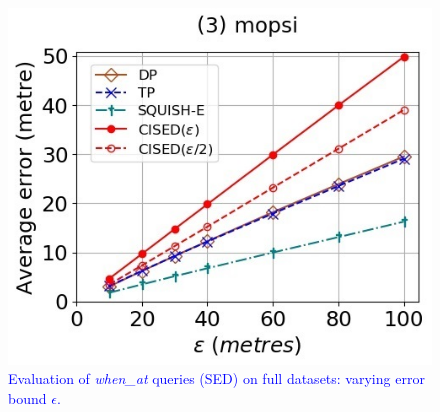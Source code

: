 \begin{figure}[tb!]
	\includegraphics[scale = 0.400]{Figures/Exp-when-SED-error-epsilon-mopsi.jpg}
	\vspace{-1ex}
	\caption{\small \textcolor{blue}{Evaluation of \emph{when\_at} queries (SED) on full datasets: varying error bound $\epsilon$.}}
	\label{fig:query-when-sed-epsilon}
	\vspace{-1.0ex}
\end{figure}

